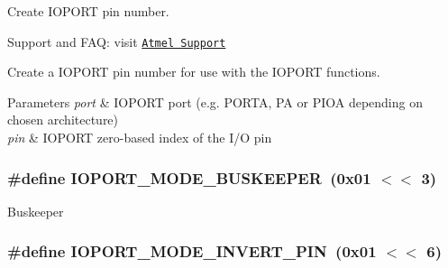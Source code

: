 Create I\-O\-P\-O\-R\-T pin number. 

Support and F\-A\-Q\-: visit \href{http://www.atmel.com/design-support/}{\tt Atmel Support}

Create a I\-O\-P\-O\-R\-T pin number for use with the I\-O\-P\-O\-R\-T functions.


\begin{DoxyParams}{Parameters}
{\em port} & I\-O\-P\-O\-R\-T port (e.\-g. P\-O\-R\-T\-A, P\-A or P\-I\-O\-A depending on chosen architecture) \\
\hline
{\em pin} & I\-O\-P\-O\-R\-T zero-\/based index of the I/\-O pin \\
\hline
\end{DoxyParams}
\hypertarget{group__ioport__group_ga877f42c6b744dd9576da832b4772f0ea}{
\subsubsection[{I\-O\-P\-O\-R\-T\-\_\-\-M\-O\-D\-E\-\_\-\-B\-U\-S\-K\-E\-E\-P\-E\-R}]{\setlength{\rightskip}{0pt plus 5cm}\#define I\-O\-P\-O\-R\-T\-\_\-\-M\-O\-D\-E\-\_\-\-B\-U\-S\-K\-E\-E\-P\-E\-R~(0x01 $<$$<$ 3)}}\label{group__ioport__group_ga877f42c6b744dd9576da832b4772f0ea}
Buskeeper \hypertarget{group__ioport__group_gaf3ae92747feac2e40c19bba09b169ac7}{
\subsubsection[{I\-O\-P\-O\-R\-T\-\_\-\-M\-O\-D\-E\-\_\-\-I\-N\-V\-E\-R\-T\-\_\-\-P\-I\-N}]{\setlength{\rightskip}{0pt plus 5cm}\#define I\-O\-P\-O\-R\-T\-\_\-\-M\-O\-D\-E\-\_\-\-I\-N\-V\-E\-R\-T\-\_\-\-P\-I\-N~(0x01 $<$$<$ 6)}}\label{group__ioport__group_gaf3ae92747feac2e40c19bba09b169ac7}
